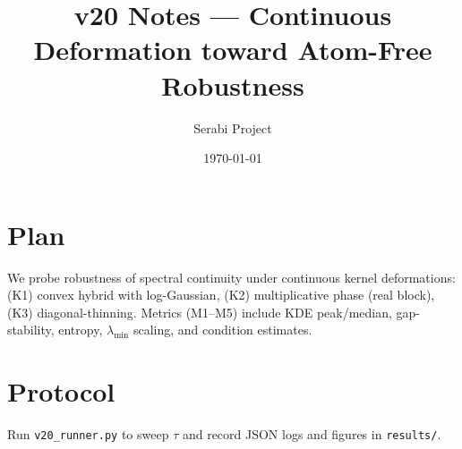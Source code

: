 \documentclass[11pt]{article}
\title{v20 Notes --- Continuous Deformation toward Atom-Free Robustness}
\author{Serabi Project}
\date{\today}
\begin{document}
\maketitle
\section*{Plan}
We probe robustness of spectral continuity under continuous kernel deformations:
(K1) convex hybrid with log-Gaussian, (K2) multiplicative phase (real block), (K3) diagonal-thinning.
Metrics (M1--M5) include KDE peak/median, gap-stability, entropy, $\lambda_{\min}$ scaling, and condition estimates.
\section*{Protocol}
Run \texttt{v20\_runner.py} to sweep $\tau$ and record JSON logs and figures in \texttt{results/}.
\end{document}
